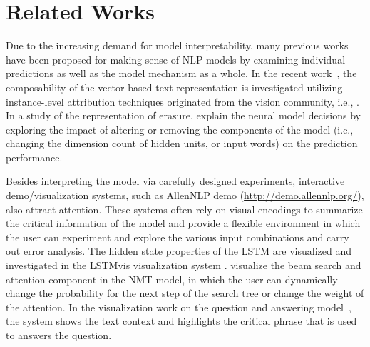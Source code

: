 \section{Related Works}
Due to the increasing demand for model interpretability, many previous works have been proposed for making sense of NLP models by examining individual predictions as well as the model mechanism as a whole. 
%
In the recent work~\cite{LiChenHovy2015}, the composability of the vector-based text representation is investigated utilizing instance-level attribution techniques originated from the vision community, i.e., \cite{ZeilerFergus2014}. 
%
In a study of the representation of erasure, \citet{li2016understanding} explain the neural model decisions by exploring the impact of altering or removing the components of the model (i.e., changing the dimension count of hidden units, or input words) on the prediction performance. 

Besides interpreting the model via carefully designed experiments, interactive demo/visualization systems, such as AllenNLP demo (\url{http://demo.allennlp.org/}), also attract attention. These systems often rely on visual encodings to summarize the critical information of the model and provide a flexible environment in which the user can experiment and explore the various input combinations and carry out error analysis.
The hidden state properties of the LSTM are visualized and investigated in the LSTMvis visualization system \cite{StrobeltGehrmannPfister2018}.
\citet{lee2017interactive} visualize the beam search and attention component in the NMT model,  in which the user can dynamically change the probability for the next step of the search tree or change the weight of the attention.
In the visualization work on the question and answering model~\cite{ruckle2017end}, the system shows the text context and highlights the critical phrase that is used to answers the question. 

